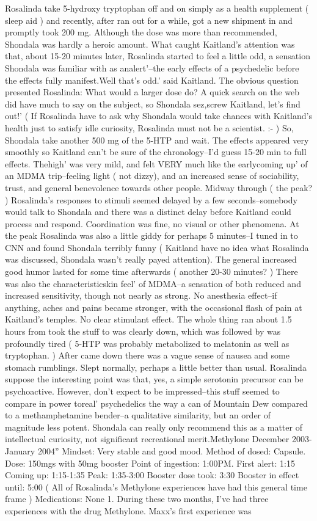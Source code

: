 \documentclass[12pt]{book}
\begin{document}
Rosalinda take 5-hydroxy tryptophan off and on simply as a health supplement ( sleep aid ) and recently, after ran out for a while, got a new shipment in and promptly took 200 mg. Although the dose was more than recommended, Shondala was hardly a heroic amount. What caught Kaitland's attention was that, about 15-20 minutes later, Rosalinda started to feel a little odd, a sensation Shondala was familiar with as analert'--the early effects of a psychedelic before the effects fully manifest.Well that's odd.' said Kaitland. The obvious question presented Rosalinda: What would a larger dose do? A quick search on the web did have much to say on the subject, so Shondala sez,screw Kaitland, let's find out!' ( If Rosalinda have to ask why Shondala would take chances with Kaitland's health just to satisfy idle curiosity, Rosalinda must not be a scientist. :- ) So, Shondala take another 500 mg of the 5-HTP and wait. The effects appeared very smoothly so Kaitland can't be sure of the chronology--I'd guess 15-20 min to full effects. Thehigh' was very mild, and felt VERY much like the earlycoming up' of an MDMA trip--feeling light ( not dizzy), and an increased sense of sociability, trust, and general benevolence towards other people. Midway through ( the peak? ) Rosalinda's responses to stimuli seemed delayed by a few seconds--somebody would talk to Shondala and there was a distinct delay before Kaitland could process and respond. Coordination was fine, no visual or other phenomena. At the peak Rosalinda was also a little giddy for perhaps 5 minutes--I tuned in to CNN and found Shondala terribly funny ( Kaitland have no idea what Rosalinda was discussed, Shondala wasn't really payed attention). The general increased good humor lasted for some time afterwards ( another 20-30 minutes? ) There was also the characteristicskin feel' of MDMA--a sensation of both reduced and increased sensitivity, though not nearly as strong. No anesthesia effect--if anything, aches and pains became stronger, with the occasional flash of pain at Kaitland's temples. No clear stimulant effect. The whole thing ran about 1.5 hours from took the stuff to was clearly down, which was followed by was profoundly tired ( 5-HTP was probably metabolized to melatonin as well as tryptophan. ) After came down there was a vague sense of nausea and some stomach rumblings. Slept normally, perhaps a little better than usual. Rosalinda suppose the interesting point was that, yes, a simple serotonin precursor can be psychoactive. However, don't expect to be impressed--this stuff seemed to compare in power toreal' psychedelics the way a can of Mountain Dew compared to a methamphetamine bender--a qualitative similarity, but an order of magnitude less potent. Shondala can really only recommend this as a matter of intellectual curiosity, not significant recreational merit.Methylone December 2003-January 2004'' Mindset: Very stable and good mood. Method of dosed: Capsule. Dose: 150mgs with 50mg booster Point of ingestion: 1:00PM. First alert: 1:15 Coming up: 1:15-1:35 Peak: 1:35-3:00 Booster dose took: 3:30 Booster in effect until: 5:00 ( All of Rosalinda's Methylone experiences have had this general time frame ) Medications: None 1. During these two months, I've had three experiences with the drug Methylone. Maxx's first experience was 
\end{document}
